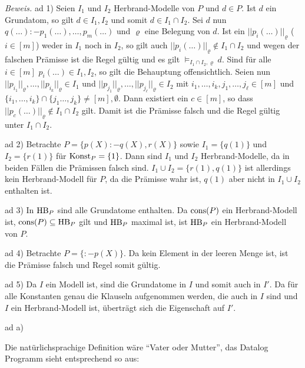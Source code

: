 \documentclass[12pt,a4paper]{amsart}
\begin{document}
{\em Beweis.}
ad 1) Seien $I_1$ und $I_2$ Herbrand-Modelle von $P$ und $d\in P$. Ist $d$ ein Grundatom, so gilt $d\in I_1,I_2$ und somit $d\in I_1\cap I_2$. Sei $d$ nun $q(\dots):-
p_1(\dots),\dots,p_m(\dots)$ und $\varrho$ eine Belegung von $d$. Ist ein $||p_i(\dots)||_{\varrho}$ ($i\in[m]$) weder in $I_1$ noch in $I_2$, so gilt auch 
$||p_i(\dots)||_{\varrho}\not\in I_1\cap I_2$ und wegen der falschen Prämisse ist die Regel gültig und es gilt $\models_{I_1\cap I_2,\varrho}d$. Sind für alle $i\in[m]$ $p_i(\dots)\in I_1,I_2$, so gilt die Behauptung offensichtlich. Seien nun $||p_{i_1}||_{\varrho},\dots,||p_{i_k}||_{\varrho}\in I_1$ und $||p_{j_1}||_{\varrho},\dots,||p_{j_{\ell}}||_{\varrho}\in I_2$ mit $i_1,\dots,i_k,j_1,\dots,j_{\ell}\in[m]$ und $\{i_1,\dots,i_k\}\cap\{j_1\dots,j_k\}\neq[m],\emptyset$. Dann existiert ein $c\in[m]$,
so dass $||p_c(\dots)||_{\varrho}\not\in I_1\cap I_2$ gilt. Damit ist die Prämisse falsch und die Regel gültig unter $I_1\cap I_2$.

\medskip

ad 2) Betrachte $P=\{p(X):-q(X),r(X)\}$ sowie $I_1=\{q(1)\}$ und $I_2=\{r(1)\}$ für $\operatorname{Konst}_P=\{1\}$. Dann sind $I_1$ und $I_2$ Herbrand-Modelle, da in beiden Fällen
die Prämissen falsch sind. $I_1\cup I_2=\{r(1),q(1)\}$ ist allerdings kein Herbrand-Modell für $P$, da die Prämisse wahr ist, $q(1)$ aber nicht in $I_1\cup I_2$ enthalten ist.

\medskip

ad 3) In $\operatorname{HB}_P$ sind alle Grundatome enthalten. Da $\operatorname{cons}(P)$ ein Herbrand-Modell ist, $\operatorname{cons}(P)\subseteq\operatorname{HB}_P$ gilt und $\operatorname{HB}_P$ maximal ist, ist $\operatorname{HB}_P$ ein Herbrand-Modell von $P$.

\medskip

ad 4) Betrachte $P=\{:-p(X)\}$. Da kein Element in der leeren Menge ist, ist die Prämisse falsch und Regel somit gültig.

\medskip

ad 5) Da $I$ ein Modell ist, sind die Grundatome in $I$ und somit auch in $I'$. Da für alle Konstanten genau die Klauseln aufgenommen werden, die auch in $I$ sind und
$I$ ein Herbrand-Modell ist, überträgt sich die Eigenschaft auf $I'$.

\begin{aufgabe1}
\end{aufgabe1}

ad a)

Die natürlichsprachige Definition wäre ``Vater oder Mutter'', das Datalog Programm sieht entsprechend so aus:
\end{document}
